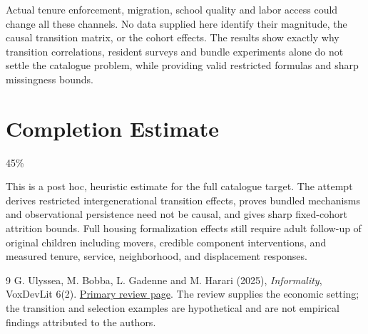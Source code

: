 \documentclass[11pt,a4paper]{article}
\begin{document}
Actual tenure enforcement, migration, school quality and labor access could change all these channels. No data supplied here identify their magnitude, the causal transition matrix, or the cohort effects. The results show exactly why transition correlations, resident surveys and bundle experiments alone do not settle the catalogue problem, while providing valid restricted formulas and sharp missingness bounds.

\section{Completion Estimate}
45\%

This is a post hoc, heuristic estimate for the full catalogue target.
The attempt derives restricted intergenerational transition effects, proves bundled mechanisms and observational persistence need not be causal, and gives sharp fixed-cohort attrition bounds. Full housing formalization effects still require adult follow-up of original children including movers, credible component interventions, and measured tenure, service, neighborhood, and displacement responses.

\begin{thebibliography}{9}
 G. Ulyssea, M. Bobba, L. Gadenne and M. Harari (2025), \emph{Informality}, VoxDevLit 6(2). \href{https://voxdev.org/voxdevlit/informality}{Primary review page}. The review supplies the economic setting; the transition and selection examples are hypothetical and are not empirical findings attributed to the authors.
\end{thebibliography}
\end{document}

